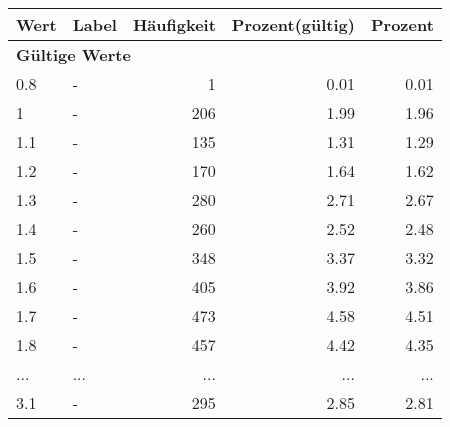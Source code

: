      \begin{longtable}{lXrrr}
     \toprule
     \textbf{Wert} & \textbf{Label} & \textbf{Häufigkeit} & \textbf{Prozent(gültig)} & \textbf{Prozent} \\
     \endhead
     \midrule
     \multicolumn{5}{l}{\textbf{Gültige Werte}}\\
        0.8 & \multicolumn{1}{X}{-} & %
          \num{1} &
          \num[round-mode=places,round-precision=2]{0.01} &
          \num[round-mode=places,round-precision=2]{0.01} \\
        1 & \multicolumn{1}{X}{-} & %
          \num{206} &
          \num[round-mode=places,round-precision=2]{1.99} &
          \num[round-mode=places,round-precision=2]{1.96} \\
        1.1 & \multicolumn{1}{X}{-} & %
          \num{135} &
          \num[round-mode=places,round-precision=2]{1.31} &
          \num[round-mode=places,round-precision=2]{1.29} \\
        1.2 & \multicolumn{1}{X}{-} & %
          \num{170} &
          \num[round-mode=places,round-precision=2]{1.64} &
          \num[round-mode=places,round-precision=2]{1.62} \\
        1.3 & \multicolumn{1}{X}{-} & %
          \num{280} &
          \num[round-mode=places,round-precision=2]{2.71} &
          \num[round-mode=places,round-precision=2]{2.67} \\
        1.4 & \multicolumn{1}{X}{-} & %
          \num{260} &
          \num[round-mode=places,round-precision=2]{2.52} &
          \num[round-mode=places,round-precision=2]{2.48} \\
        1.5 & \multicolumn{1}{X}{-} & %
          \num{348} &
          \num[round-mode=places,round-precision=2]{3.37} &
          \num[round-mode=places,round-precision=2]{3.32} \\
        1.6 & \multicolumn{1}{X}{-} & %
          \num{405} &
          \num[round-mode=places,round-precision=2]{3.92} &
          \num[round-mode=places,round-precision=2]{3.86} \\
        1.7 & \multicolumn{1}{X}{-} & %
          \num{473} &
          \num[round-mode=places,round-precision=2]{4.58} &
          \num[round-mode=places,round-precision=2]{4.51} \\
        1.8 & \multicolumn{1}{X}{-} & %
          \num{457} &
          \num[round-mode=places,round-precision=2]{4.42} &
          \num[round-mode=places,round-precision=2]{4.35} \\
       ... & ... & ... & ... & ... \\
        3.1 & \multicolumn{1}{X}{-} & %
          \num{295} &
          \num[round-mode=places,round-precision=2]{2.85} &
          \num[round-mode=places,round-precision=2]{2.81} \\


\end{longtable}
